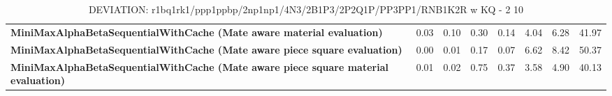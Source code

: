 \begin{table}[H]
{\begin{tabular}{|p{8cm}|*{7}{r|}}
            \rowcolor[HTML]{EFEFEF}
            \textbf{MiniMaxAlphaBetaSequentialWithCache (Mate aware material evaluation)}              & 0.03 & 0.10 & 0.30 & 0.14 & 4.04 & 6.28 & 41.97 \\
            \rowcolor[HTML]{FFFFFF}
            \textbf{MiniMaxAlphaBetaSequentialWithCache (Mate aware piece square evaluation)}               & 0.00 & 0.01 & 0.17 & 0.07 & 6.62 & 8.42 & 50.37 \\
            \rowcolor[HTML]{EFEFEF}
            \textbf{MiniMaxAlphaBetaSequentialWithCache (Mate aware piece square material evaluation)}               & 0.01 & 0.02 & 0.75 & 0.37 & 3.58 & 4.90 & 40.13 \\

            \hline
        \end{tabular}%
    }
    \caption{DEVIATION: r1bq1rk1/ppp1ppbp/2np1np1/4N3/2B1P3/2P2Q1P/PP3PP1/RNB1K2R w KQ - 2 10}
    \label{tab:complex-tactical-middle-game-deviation}
\end{table}
